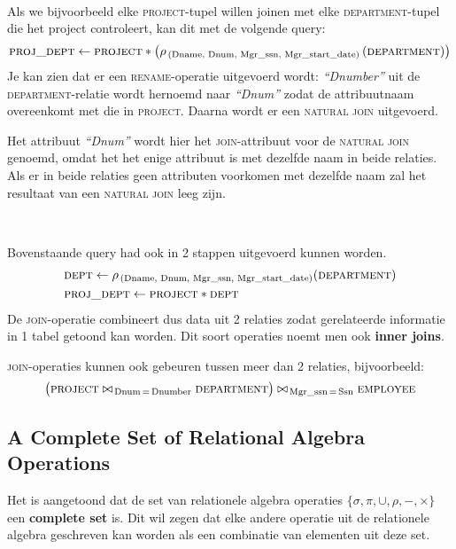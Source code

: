 ~

\noindent Als we bijvoorbeeld elke \textsc{project}-tupel willen joinen met elke \textsc{department}-tupel die het project controleert, kan dit met de volgende query:
\vspace{-2mm}
\[ \textsc{proj\_dept} \leftarrow \textsc{project} * \left(\rho_{\,\text{(Dname, Dnum, Mgr\_ssn, Mgr\_start\_date)}} \left( \textsc{department} \right) \right) \]
Je kan zien dat er een \textsc{rename}-operatie uitgevoerd wordt: \textit{``Dnumber''} uit de \textsc{department}-relatie wordt hernoemd naar \textit{``Dnum''} zodat de attribuutnaam overeenkomt met die in \textsc{project}. Daarna wordt er een \textsc{natural join} uitgevoerd.

Het attribuut \textit{``Dnum''} wordt hier het \textsc{join}-attribuut voor de \textsc{natural join} genoemd, omdat het het enige attribuut is met dezelfde naam in beide relaties. Als er in beide relaties geen attributen voorkomen met dezelfde naam zal het resultaat van een \textsc{natural join} leeg zijn.

~

\noindent Bovenstaande query had ook in 2 stappen uitgevoerd kunnen worden.
\vspace{-2mm}
\begin{align*}
& \textsc{dept} \leftarrow \rho_{\,\text{(Dname, Dnum, Mgr\_ssn, Mgr\_start\_date)}}(\textsc{department}) \\
& \textsc{proj\_dept} \leftarrow \textsc{project} * \textsc{dept}
\end{align*}
De \textsc{join}-operatie combineert dus data uit 2 relaties zodat gerelateerde informatie in 1 tabel getoond kan worden. Dit soort operaties noemt men ook \textbf{inner joins}.

\textsc{join}-operaties kunnen ook gebeuren tussen meer dan 2 relaties, bijvoorbeeld:
\vspace{-2mm}
\[ \big( \textsc{project} \bowtie_{\,\text{Dnum} \,=\, \text{Dnumber}} \textsc{department} \big) \bowtie_{\,\text{Mgr\_ssn} \,=\, \text{Ssn}} \textsc{employee} \]


\subsection{A Complete Set of Relational Algebra Operations}
Het is aangetoond dat de set van relationele algebra operaties $\{\sigma,\pi,\cup,\rho,-,\times\}$ een \textbf{complete set} is. Dit wil zegen dat elke andere operatie uit de relationele algebra geschreven kan worden als een combinatie van elementen uit deze set.

